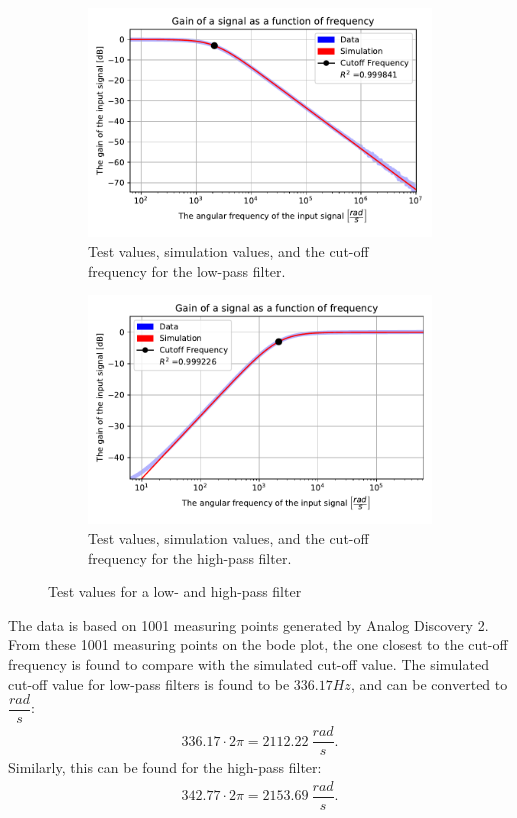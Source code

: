 \begin{figure}[H]
\centering
	\begin{subfigure}[b]{0.49\textwidth}
		\includegraphics[width=\textwidth]{fig/img/LPF_exp.pdf}
    		\caption{Test values, simulation values, and the cut-off frequency for the low-pass filter.}
    		\label{fig:lpf:exp}
	\end{subfigure}
	\begin{subfigure}[b]{0.49\textwidth}
		\includegraphics[width=\textwidth]{fig/img/HPF_exp.pdf}
    		\caption{Test values, simulation values, and the cut-off frequency for the high-pass filter.}
    		\label{fig:hpf:exp}
	\end{subfigure}
	\caption{Test values for a low- and high-pass filter}
\end{figure}
\noindent The data is based on 1001 measuring points generated by Analog Discovery 2. From these 1001 measuring points on the bode plot, the one closest to the cut-off frequency is found to compare with the simulated cut-off value. The simulated cut-off value for low-pass filters is found to be $336.17 Hz$, and can be converted to $\dfrac{rad}{s}$:
\begin{align}
336.17 \cdot 2 \pi = 2112.22 \ \dfrac{rad}{s}.
 \label{lpf:cut}
\end{align}
Similarly, this can be found for the high-pass filter:
\begin{align}
342.77 \cdot 2 \pi = 2153.69 \ \dfrac{rad}{s}.
 \label{hpf:cut}
\end{align}
